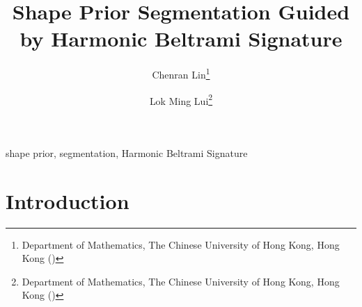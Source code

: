 \documentclass[review,onefignum,onetabnum]{siamonline190516}
\begin{document}
\title{Shape Prior Segmentation Guided by Harmonic Beltrami Signature}

\author{
    Chenran Lin\thanks{Department of Mathematics, The Chinese University of Hong Kong, Hong Kong ()}
    \and
    Lok Ming Lui\thanks{Department of Mathematics, The Chinese University of Hong Kong, Hong Kong ()}
}

\maketitle

\begin{abstract}
\end{abstract}

\begin{keywords}
    shape prior, segmentation, Harmonic Beltrami Signature
\end{keywords}

\section{Introduction}
\label{intro}
\end{document}
